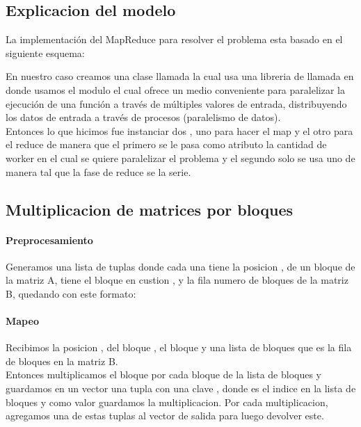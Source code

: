 \subsection{Explicacion del modelo}
    La implementación del MapReduce para resolver el problema esta basado en el
    siguiente esquema:\\

    \def\text{Esquema de un map reduce}
    \def\path{map_reduce_schema.png}
    \def\scale{.6}
    

    En nuestro caso creamos una clase llamada  la cual usa una
    libreria de  llamada  en donde usamos el
    modulo  el cual ofrece un medio conveniente para paralelizar la
    ejecución de una función a través de múltiples valores de entrada, distribuyendo
    los datos de entrada a través de procesos (paralelismo de datos).\\

    Entonces lo que hicimos fue instanciar dos , uno para hacer el map y
    el otro para el reduce de manera que el primero se le pasa como atributo la
    cantidad de worker en el cual se quiere paralelizar el problema y el segundo
    solo se usa uno de manera tal que la fase de reduce se la serie.

\subsection{Multiplicacion de matrices por bloques}

    \paragraph{Preprocesamiento}

        Generamos una lista de tuplas donde cada una tiene la posicion
        ,  de un bloque de la matriz A, tiene el bloque en
        custion , y la fila numero  de bloques de la
        matriz B, quedando con este formato: \\

    \paragraph{Mapeo}

        Recibimos la posicion ,  del bloque , el bloque
         y una lista de bloques  que es la fila  de
        bloques en la matriz B.\\
        Entonces multiplicamos el bloque  por cada bloque de la lista de
        bloques  y guardamos en un vector una tupla con una clave
        ,  donde  es el indice en la lista de
        bloques  y como valor guardamos la multiplicacion. Por cada
        multiplicacion, agregamos una de estas tuplas al vector de salida para
        luego devolver este.

